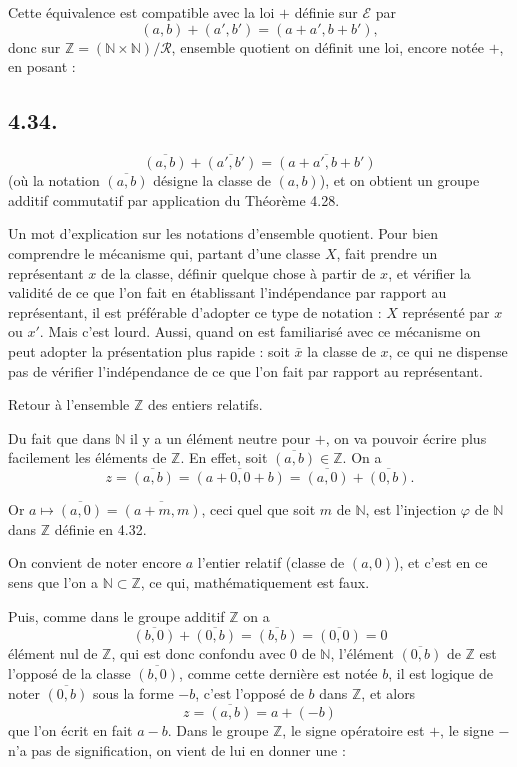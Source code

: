 Cette équivalence est compatible avec la loi $+$ définie sur $\mathcal E$ par
\[
(a,b)+(a',b')=(a+a',b+b'),
\]
donc sur $\mathbb Z=(\mathbb N\times\mathbb N)/\mathcal R$, ensemble quotient on définit une loi, encore notée $+$, en posant :

\subsection*{4.34.}
\[
\overline{(a,b)}+\overline{(a',b')}=\overline{(a+a',b+b')}
\]
(où la notation $\overline{(a,b)}$ désigne la classe de $(a,b)$), et on obtient un groupe additif commutatif par application du Théorème 4.28.

Un mot d'explication sur les notations d'ensemble quotient. Pour bien comprendre le mécanisme qui, partant d'une classe $X$, fait prendre un représentant $x$ de la classe, définir quelque chose à partir de $x$, et vérifier la validité de ce que l'on fait en établissant l'indépendance par rapport au représentant, il est préférable d'adopter ce type de notation : $X$ représenté par $x$ ou $x'$. Mais c'est lourd. Aussi, quand on est familiarisé avec ce mécanisme on peut adopter la présentation plus rapide : soit $\bar x$ la classe de $x$, ce qui ne dispense pas de vérifier l'indépendance de ce que l'on fait par rapport au représentant.

Retour à l'ensemble $\mathbb Z$ des entiers relatifs.

Du fait que dans $\mathbb N$ il y a un élément neutre pour $+$, on va pouvoir écrire plus facilement les éléments de $\mathbb Z$. En effet, soit $\overline{(a,b)}\in\mathbb Z$. On a
\[
z=\overline{(a,b)}=\overline{(a+0,0+b)}=\overline{(a,0)}+\overline{(0,b)}.
\]

Or $a\mapsto\overline{(a,0)}=\overline{(a+m,m)}$, ceci quel que soit $m$ de $\mathbb N$, est l'injection $\varphi$ de $\mathbb N$ dans $\mathbb Z$ définie en 4.32.

On convient de noter encore $a$ l'entier relatif (classe de $(a,0)$), et c'est en ce sens que l'on a $\mathbb N\subset\mathbb Z$, ce qui, mathématiquement est faux.

Puis, comme dans le groupe additif $\mathbb Z$ on a
\[
\overline{(b,0)}+\overline{(0,b)}=\overline{(b,b)}=\overline{(0,0)}=0
\]
élément nul de $\mathbb Z$, qui est donc confondu avec $0$ de $\mathbb N$, l'élément $\overline{(0,b)}$ de $\mathbb Z$ est l'opposé de la classe $\overline{(b,0)}$, comme cette dernière est notée $b$, il est logique de noter $\overline{(0,b)}$ sous la forme $-b$, c'est l'opposé de $b$ dans $\mathbb Z$, et alors
\[
z=\overline{(a,b)}=a+(-b)
\]
que l'on écrit en fait $a-b$. Dans le groupe $\mathbb Z$, le signe opératoire est $+$, le signe $-$ n'a pas de signification, on vient de lui en donner une :


